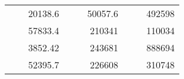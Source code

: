 \begin{table}[H]
\begin{tabular}{|ccrccrccc}
\rowcolor[HTML]{DDFDFF} 
\multicolumn{1}{|c|}{\cellcolor[HTML]{FFFFC7}}                                & \multicolumn{1}{c|}{\cellcolor[HTML]{DDFDFF}}                      & \multicolumn{1}{r|}{\cellcolor[HTML]{DAE8FC}20138.6}   & \multicolumn{1}{c|}{\cellcolor[HTML]{FFFFC7}}                                & \multicolumn{1}{c|}{\cellcolor[HTML]{DDFDFF}}                       & \multicolumn{1}{r|}{\cellcolor[HTML]{DDFDFF}50057.6}   & \multicolumn{1}{c|}{\cellcolor[HTML]{FFFFC7}}                                & \multicolumn{1}{c|}{\cellcolor[HTML]{DDFDFF}}                      & \multicolumn{1}{r|}{\cellcolor[HTML]{DDFDFF}492598}    \\ \cline{3-3} \cline{6-6} \cline{9-9} 
\multicolumn{1}{|c|}{\cellcolor[HTML]{FFFFC7}}                                & \multicolumn{1}{c|}{\cellcolor[HTML]{DDFDFF}}                      & \multicolumn{1}{r|}{\cellcolor[HTML]{DDFDFF}57833.4}   & \multicolumn{1}{c|}{\cellcolor[HTML]{FFFFC7}}                                & \multicolumn{1}{c|}{\cellcolor[HTML]{DDFDFF}}                       & \multicolumn{1}{r|}{\cellcolor[HTML]{DAE8FC}210341}    & \multicolumn{1}{c|}{\cellcolor[HTML]{FFFFC7}}                                & \multicolumn{1}{c|}{\cellcolor[HTML]{DDFDFF}}                      & \multicolumn{1}{r|}{\cellcolor[HTML]{DAE8FC}110034}    \\ \cline{3-3} \cline{6-6} \cline{9-9} 
\rowcolor[HTML]{DDFDFF} 
\multicolumn{1}{|c|}{\cellcolor[HTML]{FFFFC7}}                                & \multicolumn{1}{c|}{\cellcolor[HTML]{DDFDFF}}                      & \multicolumn{1}{r|}{\cellcolor[HTML]{DAE8FC}3852.42}   & \multicolumn{1}{c|}{\cellcolor[HTML]{FFFFC7}}                                & \multicolumn{1}{c|}{\cellcolor[HTML]{DDFDFF}}                       & \multicolumn{1}{r|}{\cellcolor[HTML]{DDFDFF}243681}    & \multicolumn{1}{c|}{\cellcolor[HTML]{FFFFC7}}                                & \multicolumn{1}{c|}{\cellcolor[HTML]{DDFDFF}}                      & \multicolumn{1}{r|}{\cellcolor[HTML]{DDFDFF}888694}    \\ \cline{3-3} \cline{6-6} \cline{9-9} 
\multicolumn{1}{|c|}{\cellcolor[HTML]{FFFFC7}}                                & \multicolumn{1}{c|}{\cellcolor[HTML]{DDFDFF}}                      & \multicolumn{1}{r|}{\cellcolor[HTML]{DDFDFF}52395.7}   & \multicolumn{1}{c|}{\cellcolor[HTML]{FFFFC7}}                                & \multicolumn{1}{c|}{\cellcolor[HTML]{DDFDFF}}                       & \multicolumn{1}{r|}{\cellcolor[HTML]{DAE8FC}226608}    & \multicolumn{1}{c|}{\cellcolor[HTML]{FFFFC7}}                                & \multicolumn{1}{c|}{\cellcolor[HTML]{DDFDFF}}                      & \multicolumn{1}{r|}{\cellcolor[HTML]{DAE8FC}310748}    \\ \cline{3-3} \cline{6-6} \cline{9-9} 

\end{tabular}
\end{table}
